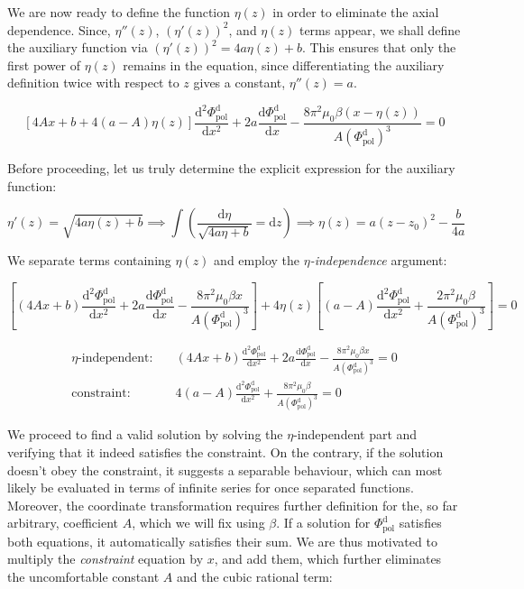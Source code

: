 We are now ready to define the function $\eta(z)$ in order to eliminate the axial dependence. Since, $\eta''(z)$, $(\eta'(z))^2$, and $\eta(z)$ terms appear, we shall define the auxiliary function via $(\eta'(z))^2=4a\eta(z)+b$. This ensures that only the first power of $\eta(z)$ remains in the equation, since differentiating the auxiliary definition twice with respect to $z$ gives a constant, $\eta''(z)=a$.

\begin{equation}
    \left[4Ax+b+4(a-A)\eta(z)\right]\frac{\mathrm{d}^2\Phi_\text{pol}^\mathrm{d}}{\mathrm{d}x^2}+2a\frac{\mathrm{d}\Phi_\text{pol}^\mathrm{d}}{\mathrm{d}x}-\frac{8\pi^2\mu_0\beta(x-\eta(z))}{A(\Phi_\text{pol}^\mathrm{d})^3}=0
\end{equation}

Before proceeding, let us truly determine the explicit expression for the auxiliary function:

\begin{equation}
    \eta'(z)=\sqrt{4a\eta(z)+b}\implies\int\left(\frac{\mathrm{d}\eta}{\sqrt{4a\eta+b}}=\mathrm{d}z\right)\implies\eta(z)=a(z-z_0)^2-\frac{b}{4a}
\end{equation}

We separate terms containing $\eta(z)$ and employ the $\eta$\textit{-independence} argument:

\begin{equation}
    \left[(4Ax+b)\frac{\mathrm{d}^2\Phi_\text{pol}^\mathrm{d}}{\mathrm{d}x^2}+2a\frac{\mathrm{d}\Phi_\text{pol}^\mathrm{d}}{\mathrm{d}x}-\frac{8\pi^2\mu_0\beta x}{A(\Phi_\text{pol}^\mathrm{d})^3}\right]+4\eta(z)\left[(a-A)\frac{\mathrm{d}^2\Phi_\text{pol}^\mathrm{d}}{\mathrm{d}x^2}+\frac{2\pi^2\mu_0\beta}{A(\Phi_\text{pol}^\mathrm{d})^3}\right]=0
\end{equation}

\begin{align}
    \eta\text{-independent:}&\quad(4Ax+b)\frac{\mathrm{d}^2\Phi_\text{pol}^\mathrm{d}}{\mathrm{d}x^2}+2a\frac{\mathrm{d}\Phi_\text{pol}^\mathrm{d}}{\mathrm{d}x}-\frac{8\pi^2\mu_0\beta x}{A(\Phi_\text{pol}^\mathrm{d})^3}=0\\
    \text{constraint:}&\quad4(a-A)\frac{\mathrm{d}^2\Phi_\text{pol}^\mathrm{d}}{\mathrm{d}x^2}+\frac{8\pi^2\mu_0\beta}{A(\Phi_\text{pol}^\mathrm{d})^3}=0
\end{align}

We proceed to find a valid solution by solving the $\eta$-independent part and verifying that it indeed satisfies the constraint. On the contrary, if the solution doesn't obey the constraint, it suggests a separable behaviour, which can most likely be evaluated in terms of infinite series for once separated functions. Moreover, the coordinate transformation requires further definition for the, so far arbitrary, coefficient $A$, which we will fix using $\beta$. If a solution for $\Phi_\text{pol}^\mathrm{d}$ satisfies both equations, it automatically satisfies their sum. We are thus motivated to multiply the \textit{constraint} equation by $x$, and add them, which further eliminates the uncomfortable constant $A$ and the cubic rational term:

